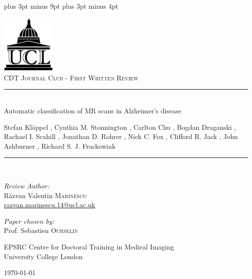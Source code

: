 \documentclass[11pt,a4paper,oneside]{report}
\begin{document}
\belowdisplayskip=12pt plus 3pt minus 9pt
\belowdisplayshortskip=7pt plus 3pt minus 4pt


\begin{titlepage}
\begin{center}

\includegraphics[width=0.2\textwidth]{ucl-logo2}~\\[1cm]


\textsc{\Large CDT Journal Club - First Written Review}\\[0.5cm]

\newcommand{\HRule}{\rule{\linewidth}{0.5mm}}

\HRule \\[0.4cm]
{ \Large Automatic classification of MR scans in Alzheimer's disease \\[0.4cm] }

{ \small Stefan Klöppel , Cynthia M. Stonnington , Carlton Chu , Bogdan Draganski , Rachael I. Scahill , Jonathan D. Rohrer , Nick C. Fox , Clifford R. Jack , John Ashburner , Richard S. J. Frackowiak}

\HRule \\[1.5cm]

\begin{minipage}{0.4\textwidth}
\begin{flushleft} \large
\emph{Review Author:}\\
R\u{a}zvan Valentin \textsc{Marinescu}\\
\href{razvan.marinescu.14@ucl.ac.uk}{razvan.marinescu.14@ucl.ac.uk}\\
\end{flushleft}
\end{minipage}
\begin{minipage}{0.4\textwidth}
\begin{flushright} \large
\emph{Paper chosen by:} \\
Prof. Sebastien \textsc{Ourselin}\\
\end{flushright}
\end{minipage}

\vfill

EPSRC Centre for Doctoral Training in Medical Imaging\\ University College London

\vfill

{\large \today}

\end{center}
\end{titlepage}
\end{document}
